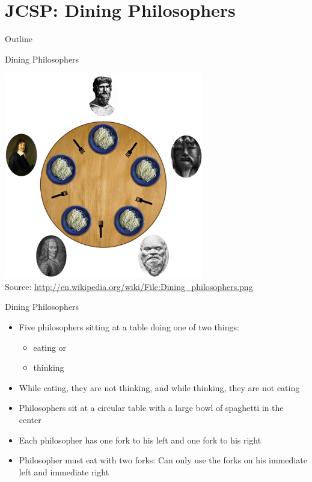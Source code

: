 \section{JCSP: Dining Philosophers}

\begin{frame}{Outline}
  \tableofcontents[current]
\end{frame}

\begin{frame}{Dining Philosophers}
  \begin{center}
    \includegraphics[width=0.65\textwidth]{figures/dining-philosophers} \\
    \tiny{Source: \url{http://en.wikipedia.org/wiki/File:Dining_philosophers.png}}
  \end{center}
\end{frame}

\begin{frame}{Dining Philosophers}
  \begin{itemize}
  \item Five philosophers sitting at a table doing one of two things:
    \begin{itemize}
    \item eating or
    \item thinking
    \end{itemize}
  \item While eating, they are not thinking, and while thinking, they
    are not eating
  \item Philosophers sit at a circular table with a large bowl of
    spaghetti in the center
  \item Each philosopher has one fork to his left and one fork to his
    right
  \item Philosopher must eat with two forks: Can only use the forks on
    his immediate left and immediate right
  \end{itemize}
\end{frame}

